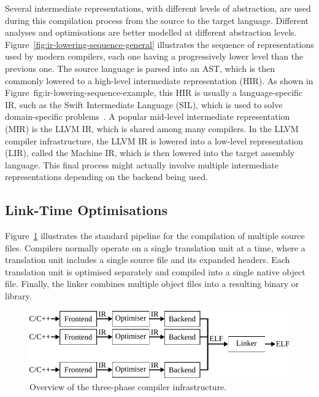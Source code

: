 Several intermediate representations, with different levels of abstraction, are used during this compilation process from the source to the target language.
Different analyses and optimisations are better modelled at different abstraction levels.
Figure~\ref{fig:ir-lowering-sequence-general} illustrates the sequence of representations used by modern compilers, each one having a progressively lower level than the previous one.
The source language is parsed into an AST, which is then commonly lowered to a high-level intermediate representation (HIR).
As shown in Figure~{fig:ir-lowering-sequence-example}, this HIR is usually a language-specific IR, such as the Swift Intermediate Language (SIL), which is used to solve domain-specific problems~\cite{lattner20}.
A popular mid-level intermediate representation (MIR) is the LLVM IR, which is shared among many compilers.
In the LLVM compiler infrastructure, the LLVM IR is lowered into a low-level representation (LIR), called the Machine IR, which is then lowered into the target assembly language.
This final process might actually involve multiple intermediate representations depending on the backend being used.


\subsection{Link-Time Optimisations}

Figure~\ref{fig:full-pipeline} illustrates the standard pipeline for the compilation of multiple source files.
Compilers normally operate on a single translation unit at a time, where a translation unit includes a single source file and its expanded headers.
Each translation unit is optimised separately and compiled into a single native object file.
Finally, the linker combines multiple object files into a resulting binary or library.

\begin{figure}[h]
  \centering
  \includegraphics[scale=0.85]{src/background/figs/full-pipeline.pdf}
  \caption{Overview of the three-phase compiler infrastructure.}
  \label{fig:full-pipeline}
\end{figure}


